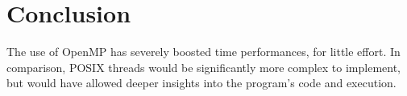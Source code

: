 \chapter{Conclusion}

The use of OpenMP has severely boosted time performances, for little effort.
In comparison, POSIX threads would be significantly more complex to implement, 
but would have allowed deeper insights into the program's code and execution.